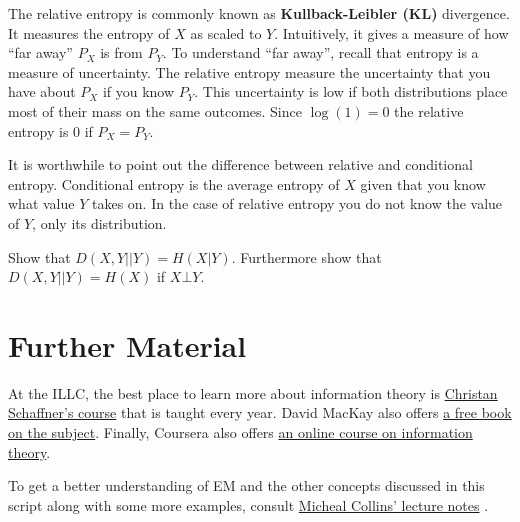The relative entropy is commonly known as \textbf{Kullback-Leibler (KL)} divergence. It measures the entropy of $ X $ as scaled to $ Y $. Intuitively,
it gives a measure of how ``far away'' $ P_{X} $ is from $ P_{Y} $. To understand ``far away'', recall that entropy is a measure of uncertainty. The
relative entropy measure the uncertainty that you have about $ P_{X} $ if you know $ P_{Y} $. This uncertainty is low if both distributions place most
of their mass on the same outcomes. Since $ \log(1) = 0 $ the relative entropy is 0 if $ P_{X} = P_{Y} $.

It is worthwhile to point out the difference between relative and conditional entropy. Conditional entropy is the average entropy of $ X $ given that you
know what value $ Y $ takes on. In the case of relative entropy you do not know the value of $ Y $, only its distribution.

\begin{Exercise}
Show that $ D(X,Y||Y) = H(X|Y) $. Furthermore show that $ D(X,Y||Y) = H(X) $ if $ X\bot Y $.
\end{Exercise}

\section*{Further Material}

At the ILLC, the best place to learn more about information theory is \href{http://homepages.cwi.nl/~schaffne/courses/inftheory/2015/}{Christan Schaffner's
course} that is taught every year. David MacKay also offers \href{http://www.inference.phy.cam.ac.uk/itprnn/book.pdf}{a free book on the subject}. Finally,
Coursera also offers \href{https://www.coursera.org/course/informationtheory}{an online course on information theory}.

To get a better understanding of EM and the other concepts discussed in this script along with some more examples, consult 
\href{http://www.cs.columbia.edu/~mcollins/em.pdf}{Micheal Collins' lecture notes} .





